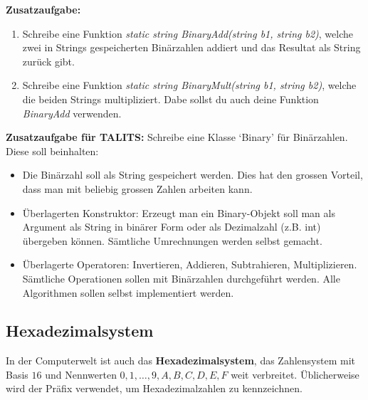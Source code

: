 \newpage


\begin{question}
	\textbf{Zusatzaufgabe:}
	\begin{enumerate}
		\item Schreibe eine Funktion \textit{static string BinaryAdd(string b1, string b2)}, welche zwei in Strings gespeicherten Binärzahlen addiert und das Resultat als String zurück gibt.
		\item Schreibe eine Funktion \textit{static string BinaryMult(string b1, string b2)}, welche die beiden Strings multipliziert. Dabe sollst du auch deine Funktion \textit{BinaryAdd} verwenden.
	\end{enumerate}
\end{question}
\begin{solution}
\end{solution}


\begin{question}
	\textbf{Zusatzaufgabe für TALITS:} Schreibe eine Klasse `Binary' für Binärzahlen. Diese soll beinhalten:
	\begin{itemize}
		\item Die Binärzahl soll als String gespeichert werden. Dies hat den grossen Vorteil, dass man mit beliebig grossen Zahlen arbeiten kann.
		\item Überlagerten Konstruktor: Erzeugt man ein Binary-Objekt soll man als Argument als String in binärer Form oder als Dezimalzahl (z.B. int) übergeben können. Sämtliche Umrechnungen werden selbst gemacht.
		\item Überlagerte Operatoren: Invertieren, Addieren, Subtrahieren, Multiplizieren. Sämtliche Operationen sollen mit Binärzahlen durchgeführt werden. Alle Algorithmen sollen selbst implementiert werden.
	\end{itemize}
\end{question}
\begin{solution}
	
\end{solution}

\newpage

\subsection{Hexadezimalsystem}

In der Computerwelt ist auch das \textbf{Hexadezimalsystem}, das Zahlensystem mit Basis $16$ und Nennwerten $0,1,\ldots,9,A,B,C,D,E,F$ weit verbreitet. Üblicherweise wird der Präfix  verwendet, um Hexadezimalzahlen zu kennzeichnen.

